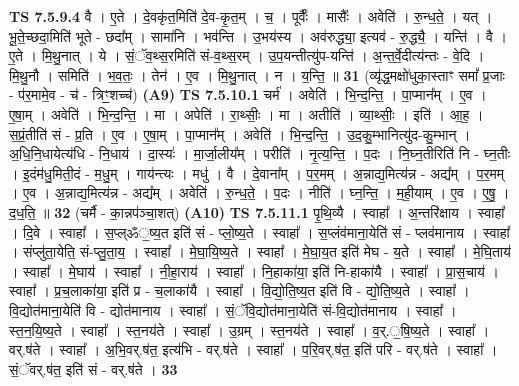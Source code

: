\documentclass[17pt]{extarticle}
\begin{document}
                  \newline
                                \textbf{ TS 7.5.9.4} \newline
                  वै । ए॒ते । दे॒वकृ॑त॒मिति॑ दे॒व-कृ॒त॒म् । च॒ । पूर्वैः᳚ । मासैः᳚ । अवेति॑ । रु॒न्ध॒ते॒ । यत् । भू॒ते॒च्छदा॒मिति॑ भूते - छदा᳚म् । सामा॑नि । भव॑न्ति । उ॒भय॑स्य । अव॑रुद्ध्या॒ इत्यव॑ - रु॒द्ध्यै॒ । यन्ति॑ । वै । ए॒ते । मि॒थु॒नात् । ये । सं॒ॅव॒थ्स॒रमिति॑ सं-व॒थ्स॒रम् । उ॒प॒यन्तीत्यु॑प-यन्ति॑ । अ॒न्त॒र्वे॒दीत्य॑न्तः - वे॒दि । मि॒थु॒नौ । समिति॑ । भ॒व॒तः॒ । तेन॑ । ए॒व । मि॒थु॒नात् । न । य॒न्ति॒ ॥ \textbf{  31} \newline
                  \newline
                      (व्यृ॑द्ध॒मक्षो॑धुका॒स्ताꣳ समां᳚ प्र॒जाः - प॑र॒मामे॒व - च॑ - त्रिꣳ॒॒शच्च॑)  \textbf{(A9)} \newline \newline
                                \textbf{ TS 7.5.10.1} \newline
                  चर्म॑ । अवेति॑ । भि॒न्द॒न्ति॒ । पा॒प्मान᳚म् । ए॒व । ए॒षा॒म् । अवेति॑ । भि॒न्द॒न्ति॒ । मा । अपेति॑ । रा॒थ्सीः॒ । मा । अतीति॑ । व्या॒थ्सीः॒ । इति॑ । आ॒ह॒ । स॒प्रं॒तीति॑ सं - प्र॒ति । ए॒व । ए॒षा॒म् । पा॒प्मान᳚म् । अवेति॑ । भि॒न्द॒न्ति॒ । उ॒द॒कु॒म्भानित्यु॑द-कु॒म्भान् । अ॒धि॒नि॒धायेत्य॑धि - नि॒धाय॑ । दा॒स्यः॑ । मा॒र्जा॒लीय᳚म् । परीति॑ । नृ॒त्य॒न्ति॒ । प॒दः । नि॒घ्न॒तीरिति॑ नि - घ्न॒तीः । इ॒दंम॑धु॒मिती॒दं - म॒धु॒म् । गाय॑न्त्यः । मधु॑ । वै । दे॒वाना᳚म् । प॒र॒मम् । अ॒न्नाद्य॒मित्य॑न्न - अद्य᳚म् । प॒र॒मम् । ए॒व । अ॒न्नाद्य॒मित्य॑न्न - अद्य᳚म् । अवेति॑ । रु॒न्ध॒ते॒ । प॒दः । नीति॑ । घ्न॒न्ति॒ । म॒ही॒याम् । ए॒व । ए॒षु॒ । द॒ध॒ति॒ ॥ \textbf{  32} \newline
                  \newline
                      (चर्मै - का॒न्नप॑ञ्चा॒शत्)  \textbf{(A10)} \newline \newline
                                \textbf{ TS 7.5.11.1} \newline
                  पृ॒थि॒व्यै । स्वाहा᳚ । अ॒न्तरि॑क्षाय । स्वाहा᳚ । दि॒वे । स्वाहा᳚ । स॒प्ल्ॐ॒ष्य॒त इति॑ सं - प्लो॒ष्य॒ते । स्वाहा᳚ । स॒प्लंव॑माना॒येति॑ सं - प्लव॑मानाय । स्वाहा᳚ । संप्लु॑ता॒येति॒ सं-प्लु॒ता॒य॒ । स्वाहा᳚ । मे॒घा॒यि॒ष्य॒ते । स्वाहा᳚ । मे॒घा॒य॒त इति॑ मेघ - य॒ते । स्वाहा᳚ । मे॒घि॒ताय॑ । स्वाहा᳚ । मे॒घाय॑ । स्वाहा᳚ । नी॒हा॒राय॑ । स्वाहा᳚ । नि॒हाका॑या॒ इति॑ नि-हाका॑यै । स्वाहा᳚ । प्रा॒स॒चाय॑ । स्वाहा᳚ । प्र॒च॒लाका॑या॒ इति॑ प्र - च॒लाका॑यै । स्वाहा᳚ । वि॒द्यो॒ति॒ष्य॒त इति॑ वि - द्यो॒ति॒ष्य॒ते । स्वाहा᳚ । वि॒द्योत॑माना॒येति॑ वि - द्योत॑मानाय । स्वाहा᳚ । सं॒ॅवि॒द्योत॑माना॒येति॑ सं-वि॒द्योत॑मानाय । स्वाहा᳚ । स्त॒न॒यि॒ष्य॒ते । स्वाहा᳚ । स्त॒नय॑ते । स्वाहा᳚ । उ॒ग्रम् । स्त॒नय॑ते । स्वाहा᳚ । व॒र्.॒षि॒ष्य॒ते । स्वाहा᳚ । वर्.ष॑ते । स्वाहा᳚ । अ॒भि॒वर्.ष॑त॒ इत्य॑भि - वर्.ष॑ते । स्वाहा᳚ । प॒रि॒वर्.ष॑त॒ इति॑ परि - वर्.ष॑ते । स्वाहा᳚ । सं॒ॅवर्.ष॑त॒ इति॑ सं - वर्.ष॑ते । \textbf{  33} \newline
\end{document}
